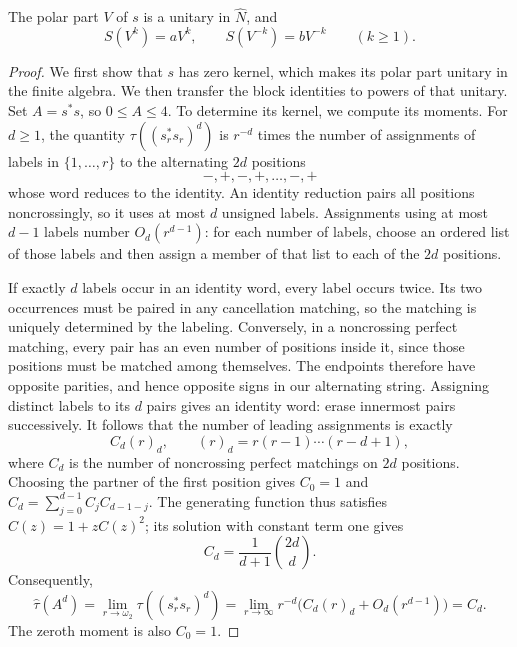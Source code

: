 \begin{lemma}\label{lem:rigidity-polar}
The polar part $V$ of $s$ is a unitary in $\widehat N$, and
\begin{equation}\label{eq:rigidity-power-identities}
 S(V^k)=aV^k,\qquad S(V^{-k})=bV^{-k}
 \qquad(k\geq1).
\end{equation}
\end{lemma}

\begin{proof}
We first show that $s$ has zero kernel, which makes its polar part
unitary in the finite algebra.  We then transfer the block identities
to powers of that unitary.
Set $A=s^*s$, so $0\leq A\leq4$.  To determine its kernel, we compute
its moments.  For
$d\geq1$, the quantity $\tau((s_r^*s_r)^d)$ is $r^{-d}$ times the
number of assignments of labels in $\{1,\ldots,r\}$ to the alternating
$2d$ positions
\[
 -,+,-,+,\ldots,-,+
\]
whose word reduces to the identity.  An identity reduction pairs all
positions noncrossingly, so it uses at most $d$ unsigned labels.
Assignments using at most $d-1$ labels number $O_d(r^{d-1})$: for each
number of labels, choose an ordered list of those labels and then
assign a member of that list to each of the $2d$ positions.

If exactly $d$ labels occur in an identity word, every label occurs
twice.  Its two occurrences must be paired in any cancellation
matching, so the matching is uniquely determined by the labeling.
Conversely, in a noncrossing perfect matching, every pair has an even
number of positions inside it, since those positions must be matched
among themselves.  The endpoints therefore have opposite parities,
and hence opposite signs in our alternating string.  Assigning
distinct labels to its $d$ pairs gives an identity word: erase
innermost pairs successively.  It follows that the number of leading
assignments is exactly
\[
 C_d(r)_d,\qquad (r)_d=r(r-1)\cdots(r-d+1),
\]
where $C_d$ is the number of noncrossing perfect matchings on $2d$
positions.  Choosing the partner of the first position gives
$C_0=1$ and $C_d=\sum_{j=0}^{d-1}C_jC_{d-1-j}$.  The generating
function thus satisfies $C(z)=1+zC(z)^2$; its solution with constant
term one gives
\[
 C_d=\frac1{d+1}\binom{2d}{d}.
\]
Consequently,
\begin{equation}\label{eq:rigidity-catalan-moments}
 \widehat\tau(A^d)
 =\lim_{r\to\omega_2}\tau((s_r^*s_r)^d)
 =\lim_{r\to\infty}r^{-d}
       \bigl(C_d(r)_d+O_d(r^{d-1})\bigr)
 =C_d.
\end{equation}
The zeroth moment is also $C_0=1$.


\end{proof}
